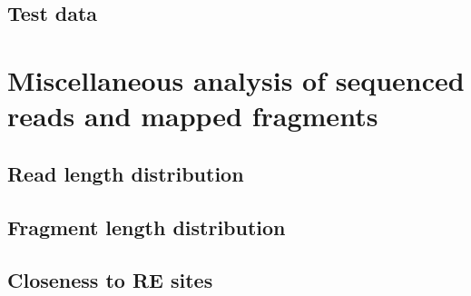 \documentclass[11pt]{article}
\begin{document}
\subsection{Test data}


\section{Miscellaneous analysis of sequenced reads and mapped fragments}

\subsection{Read length distribution}

\subsection{Fragment length distribution}

\subsection{Closeness to RE sites}


\end{document}
